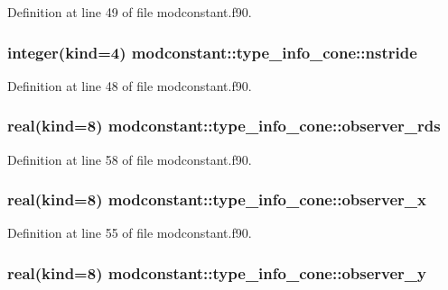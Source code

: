Definition at line 49 of file modconstant.\-f90.

\hypertarget{structmodconstant_1_1type__info__cone_a7a8405461f75f1428b69e170ced58b66}{
\subsubsection[{nstride}]{\setlength{\rightskip}{0pt plus 5cm}integer(kind=4) modconstant\-::type\-\_\-info\-\_\-cone\-::nstride}}\label{structmodconstant_1_1type__info__cone_a7a8405461f75f1428b69e170ced58b66}


Definition at line 48 of file modconstant.\-f90.

\hypertarget{structmodconstant_1_1type__info__cone_a81805ab92d84e021f5005ec101b08397}{
\subsubsection[{observer\-\_\-rds}]{\setlength{\rightskip}{0pt plus 5cm}real(kind=8) modconstant\-::type\-\_\-info\-\_\-cone\-::observer\-\_\-rds}}\label{structmodconstant_1_1type__info__cone_a81805ab92d84e021f5005ec101b08397}


Definition at line 58 of file modconstant.\-f90.

\hypertarget{structmodconstant_1_1type__info__cone_a5e4f264a3e87ff2189a91c099ba60716}{
\subsubsection[{observer\-\_\-x}]{\setlength{\rightskip}{0pt plus 5cm}real(kind=8) modconstant\-::type\-\_\-info\-\_\-cone\-::observer\-\_\-x}}\label{structmodconstant_1_1type__info__cone_a5e4f264a3e87ff2189a91c099ba60716}


Definition at line 55 of file modconstant.\-f90.

\hypertarget{structmodconstant_1_1type__info__cone_a71b2abc44f717415d0cd7e8cd13ba7dd}{
\subsubsection[{observer\-\_\-y}]{\setlength{\rightskip}{0pt plus 5cm}real(kind=8) modconstant\-::type\-\_\-info\-\_\-cone\-::observer\-\_\-y}}\label{structmodconstant_1_1type__info__cone_a71b2abc44f717415d0cd7e8cd13ba7dd}


